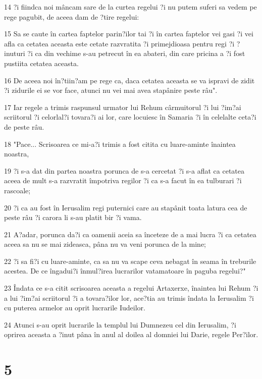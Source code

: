 \par 14 ?i fiindca noi mâncam sare de la curtea regelui ?i nu putem suferi sa vedem pe rege pagubit, de aceea dam de ?tire regelui:
\par 15 Sa se caute în cartea faptelor parin?ilor tai ?i în cartea faptelor vei gasi ?i vei afla ca cetatea aceasta este cetate razvratita ?i primejdioasa pentru regi ?i ?inuturi ?i ca din vechime s-au petrecut în ea abateri, din care pricina a ?i fost pustiita cetatea aceasta.
\par 16 De aceea noi în?tiin?am pe rege ca, daca cetatea aceasta se va ispravi de zidit ?i zidurile ei se vor face, atunci nu vei mai avea stapânire peste râu".
\par 17 Iar regele a trimis raspunsul urmator lui Rehum cârmuitorul ?i lui ?im?ai scriitorul ?i celorlal?i tovara?i ai lor, care locuiesc în Samaria ?i în celelalte ceta?i de peste râu.
\par 18 "Pace... Scrisoarea ce mi-a?i trimis a fost citita cu luare-aminte înaintea noastra,
\par 19 ?i s-a dat din partea noastra porunca de s-a cercetat ?i s-a aflat ca cetatea aceea de mult s-a razvratit împotriva regilor ?i ca s-a facut în ea tulburari ?i rascoale;
\par 20 ?i ca au fost în Ierusalim regi puternici care au stapânit toata latura cea de peste râu ?i carora li s-au platit bir ?i vama.
\par 21 A?adar, porunca da?i ca oamenii aceia sa înceteze de a mai lucra ?i ca cetatea aceea sa nu se mai zideasca, pâna nu va veni porunca de la mine;
\par 22 ?i sa fi?i cu luare-aminte, ca sa nu va scape ceva nebagat în seama în treburile acestea. De ce îngadui?i înmul?irea lucrarilor vatamatoare în paguba regelui?"
\par 23 Îndata ce s-a citit scrisoarea aceasta a regelui Artaxerxe, înaintea lui Rehum ?i a lui ?im?ai scriitorul ?i a tovara?ilor lor, ace?tia au trimis îndata la Ierusalim ?i cu puterea armelor au oprit lucrarile Iudeilor.
\par 24 Atunci s-au oprit lucrarile la templul lui Dumnezeu cel din Ierusalim, ?i oprirea aceasta a ?inut pâna în anul al doilea al domniei lui Darie, regele Per?ilor.

\chapter{5}

